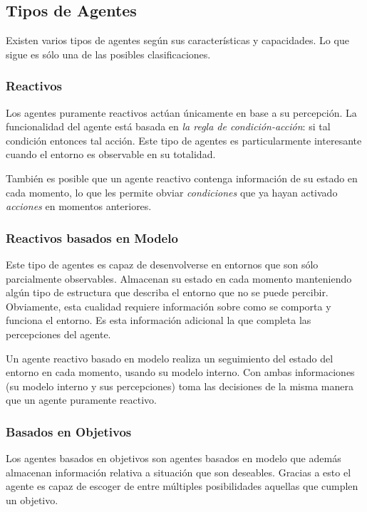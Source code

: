 \subsection{Tipos de Agentes}

Existen varios tipos de agentes según sus características y capacidades. Lo que
sigue es sólo una de las posibles clasificaciones.

\subsubsection{Reactivos}

Los agentes puramente reactivos actúan únicamente en base a su percepción. La
funcionalidad del agente está basada en {\em la regla de condición-acción}: si
tal condición entonces tal acción. Este tipo de agentes es particularmente
interesante cuando el entorno es observable en su totalidad.

También es posible que un agente reactivo contenga información de su estado en
cada momento, lo que les permite obviar {\em condiciones} que ya hayan activado
{\em acciones} en momentos anteriores.

\subsubsection{Reactivos basados en Modelo}

Este tipo de agentes es capaz de desenvolverse en entornos que son sólo
parcialmente observables. Almacenan su estado en cada momento manteniendo algún
tipo de estructura que describa el entorno que no se puede percibir.
Obviamente, esta cualidad requiere información sobre como se comporta y
funciona el entorno. Es esta información adicional la que completa las
percepciones del agente.

Un agente reactivo basado en modelo realiza un seguimiento del estado del
entorno en cada momento, usando su modelo interno. Con ambas informaciones (su
modelo interno y sus percepciones) toma las decisiones de la misma manera que un
agente puramente reactivo.

\subsubsection{Basados en Objetivos}

Los agentes basados en objetivos son agentes basados en modelo que además
almacenan información relativa a situación que son deseables. Gracias a esto el
agente es capaz de escoger de entre múltiples posibilidades aquellas que
cumplen un objetivo.

